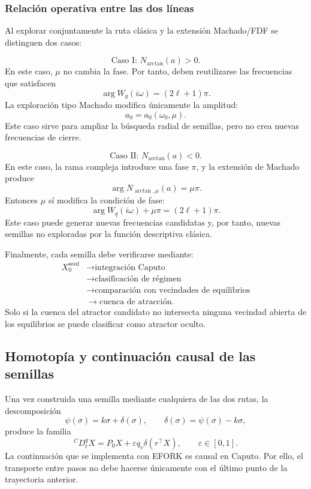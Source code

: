 \documentclass[journal]{IEEEtran}
\begin{document}
\subsubsection{Relación operativa entre las dos líneas}

Al explorar conjuntamente la ruta clásica y la extensión Machado/FDF se
distinguen dos casos:

\[
\text{Caso I: } N_{\arctan}(a)>0.
\]
En este caso, \(\mu\) no cambia la fase. Por tanto, deben reutilizarse las
frecuencias que satisfacen
\[
\arg
W_q(i\omega)
=
(2\ell+1)\pi.
\]
La exploración tipo Machado modifica únicamente la amplitud:
\[
a_0=a_0(\omega_0,\mu).
\]
Este caso sirve para ampliar la búsqueda radial de semillas, pero no crea
nuevas frecuencias de cierre.

\[
\text{Caso II: } N_{\arctan}(a)<0.
\]
En este caso, la rama compleja introduce una fase \(\pi\), y la extensión de
Machado produce
\[
\arg N_{\arctan,\mu}(a)=\mu\pi.
\]
Entonces \(\mu\) sí modifica la condición de fase:
\[
\arg
W_q(i\omega)
+
\mu\pi
=
(2\ell+1)\pi.
\]
Este caso puede generar nuevas frecuencias candidatas y, por tanto, nuevas
semillas no exploradas por la función descriptiva clásica.

Finalmente, cada semilla debe verificarse mediante:
\[
\begin{aligned}
X_0^{\mathrm{seed}}
&\longrightarrow \text{integración Caputo}\\
&\longrightarrow \text{clasificación de régimen}\\
&\longrightarrow \text{comparación con vecindades de equilibrios}\\
&\longrightarrow \text{cuenca de atracción}.
\end{aligned}
\]
Solo si la cuenca del atractor candidato no intersecta ninguna vecindad
abierta de los equilibrios se puede clasificar como atractor oculto.

\subsection{Homotopía y continuación causal de las semillas}

Una vez construida una semilla mediante cualquiera de las dos rutas, la
descomposición
\begin{equation}
\label{eq:delta_arctan}
\psi(\sigma)=k\sigma+\delta(\sigma),
\qquad
\delta(\sigma)=\psi(\sigma)-k\sigma,
\end{equation}
produce la familia
\begin{equation}
\label{eq:homotopy_caputo_arctan}
{}^{C}D_t^qX=P_0X+\varepsilon q_v\delta(r^\top X),
\qquad \varepsilon\in[0,1].
\end{equation}
La continuación que se implementa con EFORK es causal en Caputo. Por ello,
el transporte entre pasos no debe hacerse únicamente con el último punto de
la trayectoria anterior.
\end{document}
